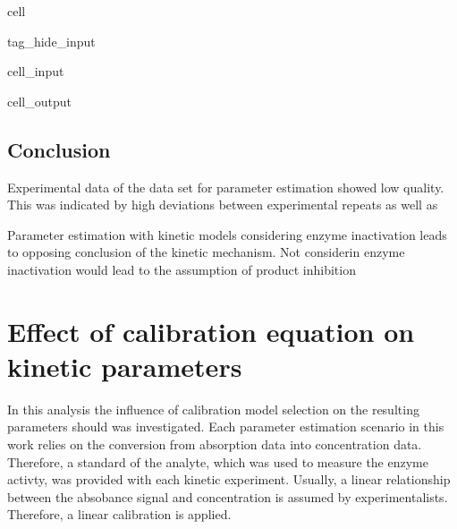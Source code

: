 \documentclass[letterpaper,10pt,english]{jupyterBook}
\begin{document}
\begin{sphinxuseclass}{cell}
\begin{sphinxuseclass}{tag_hide_input}
\begin{sphinxVerbatimInput}
\begin{sphinxuseclass}{cell_input}
\end{sphinxuseclass}\end{sphinxVerbatimInput}
\begin{sphinxVerbatimOutput}

\begin{sphinxuseclass}{cell_output}
\noindent{}

\end{sphinxuseclass}\end{sphinxVerbatimOutput}

\end{sphinxuseclass}
\end{sphinxuseclass}

\subsection{Conclusion}
\label{\detokenize{scenarios/enzyme_inactivation:conclusion}}
\sphinxAtStartPar
{}

\sphinxAtStartPar
Experimental data of the data set for parameter estimation showed low quality. This was indicated by high deviations between experimental repeats as well as

\sphinxAtStartPar
{}
Parameter estimation with kinetic models considering enzyme inactivation leads to opposing conclusion of the kinetic mechanism.
Not considerin enzyme inactivation would lead to the assumption of product inhibition

\sphinxstepscope


\section{Effect of calibration equation on kinetic parameters}
\label{\detokenize{scenarios/effect_calibration_model:effect-of-calibration-equation-on-kinetic-parameters}}\label{\detokenize{scenarios/effect_calibration_model::doc}}
\sphinxAtStartPar
In this analysis the influence of calibration model selection on the resulting parameters should was investigated. Each parameter estimation scenario in this work relies on the conversion from absorption data into concentration data. Therefore, a standard of the analyte, which was used to measure the enzyme activty, was provided with each kinetic experiment. Usually, a linear relationship between the absobance signal and concentration is assumed by experimentalists. Therefore, a linear calibration is applied.
\end{document}
